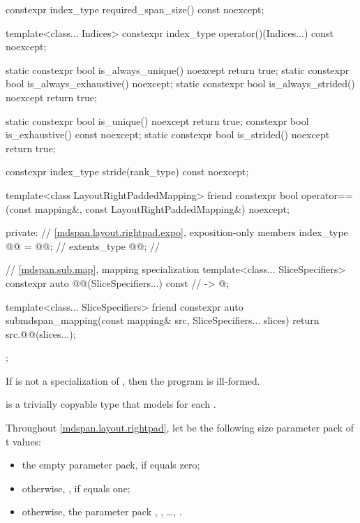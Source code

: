 \begin{codeblock}
{{    constexpr index_type required_span_size() const noexcept;

    template<class... Indices>
      constexpr index_type operator()(Indices...) const noexcept;

    static constexpr bool is_always_unique() noexcept { return true; }
    static constexpr bool is_always_exhaustive() noexcept;
    static constexpr bool is_always_strided() noexcept { return true; }

    static constexpr bool is_unique() noexcept { return true; }
    constexpr bool is_exhaustive() const noexcept;
    static constexpr bool is_strided() noexcept { return true; }

    constexpr index_type stride(rank_type) const noexcept;

    template<class LayoutRightPaddedMapping>
      friend constexpr bool operator==(const mapping&, const LayoutRightPaddedMapping&) noexcept;

  private:
    // \ref{mdspan.layout.rightpad.expo}, exposition-only members
    index_type @@ = @@;                         // \expos
    extents_type @@{};                                               // \expos

    // \ref{mdspan.sub.map},  mapping specialization
    template<class... SliceSpecifiers>
      constexpr auto @@(SliceSpecifiers...) const     // \expos
        -> @\seebelow@;

    template<class... SliceSpecifiers>
      friend constexpr auto submdspan_mapping(const mapping& src, SliceSpecifiers... slices) {
      return src.@@(slices...);
    }
  };
}
\end{codeblock}

\pnum
If  is not a specialization of ,
then the program is ill-formed.

\pnum
{} is a trivially copyable type
that models  for each .

\pnum
Throughout \ref{mdspan.layout.rightpad},
let  be the following
size  parameter pack of t values:
\begin{itemize}
\item
the empty parameter pack, if  equals zero;
\item
\tcode otherwise, , if  equals one;
\item
otherwise, the parameter pack , , \ldots, .
\end{itemize}

